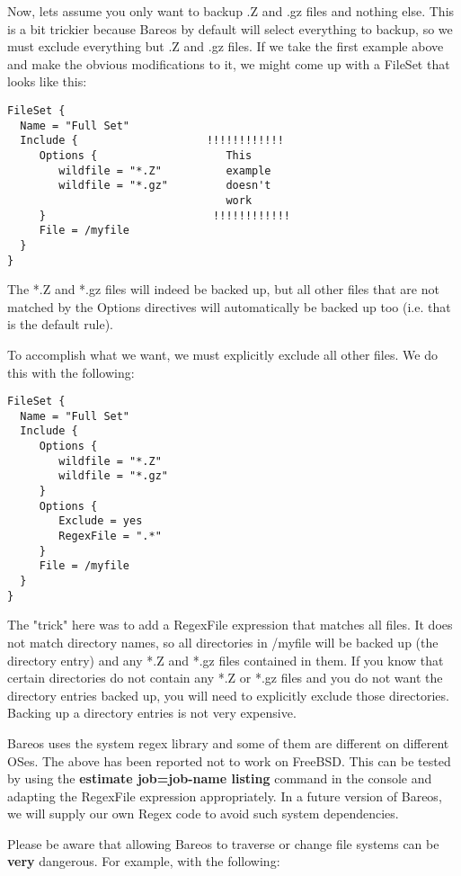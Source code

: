 Now, lets assume you only want to backup .Z and .gz files and nothing
else. This is a bit trickier because Bareos by default will select
everything to backup, so we must exclude everything but .Z and .gz files.
If we take the first example above and make the obvious modifications
to it, we might come up with a FileSet that looks like this:

\footnotesize
\begin{verbatim}
FileSet {
  Name = "Full Set"
  Include {                    !!!!!!!!!!!!
     Options {                    This
        wildfile = "*.Z"          example
        wildfile = "*.gz"         doesn't
                                  work
     }                          !!!!!!!!!!!!
     File = /myfile
  }
}
\end{verbatim}
\normalsize

The *.Z and *.gz files will indeed be backed up, but all other files
that are not matched by the Options directives will automatically
be backed up too (i.e. that is the default rule).

To accomplish what we want, we must explicitly exclude all other files.
We do this with the following:

\footnotesize
\begin{verbatim}
FileSet {
  Name = "Full Set"
  Include {
     Options {
        wildfile = "*.Z"
        wildfile = "*.gz"
     }
     Options {
        Exclude = yes
        RegexFile = ".*"
     }
     File = /myfile
  }
}
\end{verbatim}
\normalsize

The "trick" here was to add a RegexFile expression that matches
all files. It does not match directory names, so all directories in
/myfile will be backed up (the directory entry) and any *.Z and *.gz
files contained in them. If you know that certain directories do
not contain any *.Z or *.gz files and you do not want the directory
entries backed up, you will need to explicitly exclude those directories.
Backing up a directory entries is not very expensive.

Bareos uses the system regex library and some of them are
different on different OSes. The above has been reported not to work
on FreeBSD. This can be tested by using the {\bf estimate job=job-name
listing} command in the console and adapting the RegexFile expression
appropriately. In a future version of Bareos, we will supply our own
Regex code to avoid such system dependencies.

Please be aware that allowing Bareos to traverse or change file systems can be
{\bf very} dangerous. For example, with the following:

